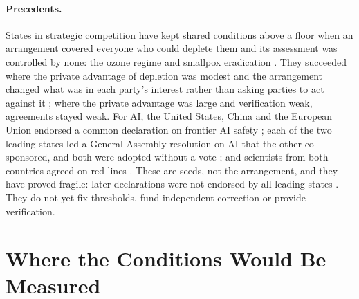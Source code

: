 \documentclass[letterpaper]{article} %
\theoremstyle{definition}
\begin{document}
\paragraph{Precedents.} States in strategic competition have kept shared conditions above a floor when an arrangement covered everyone who could deplete them and its assessment was controlled by none: the ozone regime and smallpox eradication \citep{barrett2003,barrett2007}. They succeeded where the private advantage of depletion was modest and the arrangement changed what was in each party's interest rather than asking parties to act against it \citep{barrett1994,barrett2003}; where the private advantage was large and verification weak, agreements stayed weak. For AI, the United States, China and the European Union endorsed a common declaration on frontier AI safety \citep{bletchley2023}; each of the two leading states led a General Assembly resolution on AI that the other co-sponsored, and both were adopted without a vote \citep{unga2024,unga2024capacity}; and scientists from both countries agreed on red lines \citep{idais2024}. These are seeds, not the arrangement, and they have proved fragile: later declarations were not endorsed by all leading states \citep{paris2025}. They do not yet fix thresholds, fund independent correction or provide verification.

\section{Where the Conditions Would Be Measured}\label{sec:evidence}
\end{document}
